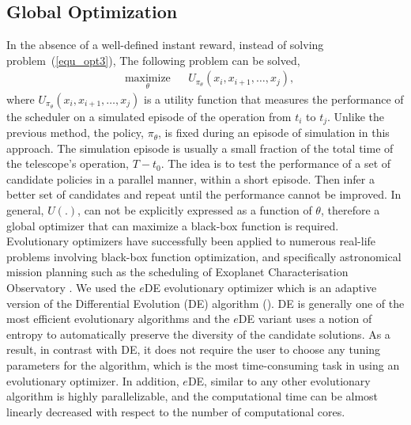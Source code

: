\documentclass[12pt]{aastex62}
\theoremstyle{definition}
\begin{document}
\subsection{Global Optimization}\label{sec_gopt}
In the absence of a well-defined instant reward, instead of solving problem~(\ref{equ_opt3}), The following problem can be solved,
%
\begin{equation}%
\begin{aligned}
& \underset{\theta}{\text{maximize}}
& & U_{\pi_{\theta}}(x_i,x_{i+1}, \dots, x_{j}),
\end{aligned}
\end{equation}
%
where $U_{\pi_{\theta}}(x_i,x_{i+1}, \dots, x_{j})$ is a utility function that measures the performance of the scheduler on a simulated episode of the operation from $t_i$ to $t_j$. Unlike the previous method, the policy, $\pi_{\theta}$, is fixed during an episode of simulation in this approach. The simulation episode is usually a small fraction of the total time of the telescope's operation, $T - t_0$. The idea is to test the performance of a set of candidate policies in a parallel manner, within a short episode. Then infer a better set of candidates and repeat until the performance cannot be improved. In general, $U(.)$, can not be explicitly expressed as a function of $\theta$, therefore a global optimizer that can maximize a black-box function is required. Evolutionary optimizers have successfully been applied to numerous real-life problems involving black-box function optimization, and specifically astronomical mission planning such as the scheduling of Exoplanet Characterisation Observatory \citep{garcia2015artificial}. We used the $e$DE evolutionary optimizer \citep{naghib2016entropic} which is an adaptive version of the Differential Evolution (DE) algorithm (\citep{storn1997differential}). DE is generally one of the most efficient evolutionary algorithms and the $e$DE variant uses a notion of entropy to automatically preserve the diversity of the candidate solutions. As a result, in contrast with DE, it does not require the user to choose any tuning parameters for the algorithm, which is the most time-consuming task in using an evolutionary optimizer. In addition, $e$DE, similar to any other evolutionary algorithm is highly parallelizable, and the computational time can be almost linearly decreased with respect to the number of computational cores.
\end{document}

